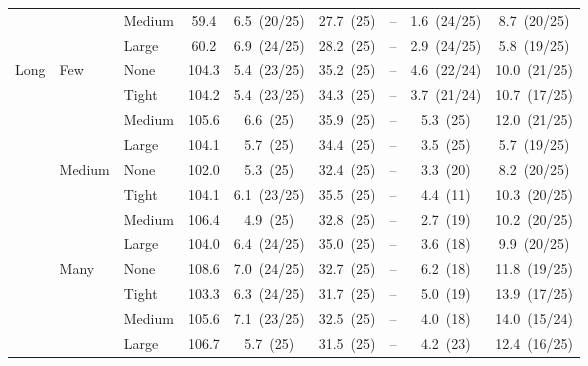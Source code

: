 \begin{table}[htbp]
{\begin{tabular}{lll c ccccc}
 &  & {\small Medium} & 59.4 & 6.5~{\scriptsize(20/25)} & 27.7~{\scriptsize(25)} & -- & 1.6~{\scriptsize(24/25)} & 8.7~{\scriptsize(20/25)} \\
 &  & {\small Large} & 60.2 & 6.9~{\scriptsize(24/25)} & 28.2~{\scriptsize(25)} & -- & 2.9~{\scriptsize(24/25)} & 5.8~{\scriptsize(19/25)} \\
\midrule
\multirow{12}{*}{\small Long} & \multirow{4}{*}{\small Few} & {\small None} & 104.3 & 5.4~{\scriptsize(23/25)} & 35.2~{\scriptsize(25)} & -- & 4.6~{\scriptsize(22/24)} & 10.0~{\scriptsize(21/25)} \\
 &  & {\small Tight} & 104.2 & 5.4~{\scriptsize(23/25)} & 34.3~{\scriptsize(25)} & -- & 3.7~{\scriptsize(21/24)} & 10.7~{\scriptsize(17/25)} \\
 &  & {\small Medium} & 105.6 & 6.6~{\scriptsize(25)} & 35.9~{\scriptsize(25)} & -- & 5.3~{\scriptsize(25)} & 12.0~{\scriptsize(21/25)} \\
 &  & {\small Large} & 104.1 & 5.7~{\scriptsize(25)} & 34.4~{\scriptsize(25)} & -- & 3.5~{\scriptsize(25)} & 5.7~{\scriptsize(19/25)} \\
 & \multirow{4}{*}{\small Medium} & {\small None} & 102.0 & 5.3~{\scriptsize(25)} & 32.4~{\scriptsize(25)} & -- & 3.3~{\scriptsize(20)} & 8.2~{\scriptsize(20/25)} \\
 &  & {\small Tight} & 104.1 & 6.1~{\scriptsize(23/25)} & 35.5~{\scriptsize(25)} & -- & 4.4~{\scriptsize(11)} & 10.3~{\scriptsize(20/25)} \\
 &  & {\small Medium} & 106.4 & 4.9~{\scriptsize(25)} & 32.8~{\scriptsize(25)} & -- & 2.7~{\scriptsize(19)} & 10.2~{\scriptsize(20/25)} \\
 &  & {\small Large} & 104.0 & 6.4~{\scriptsize(24/25)} & 35.0~{\scriptsize(25)} & -- & 3.6~{\scriptsize(18)} & 9.9~{\scriptsize(20/25)} \\
 & \multirow{4}{*}{\small Many} & {\small None} & 108.6 & 7.0~{\scriptsize(24/25)} & 32.7~{\scriptsize(25)} & -- & 6.2~{\scriptsize(18)} & 11.8~{\scriptsize(19/25)} \\
 &  & {\small Tight} & 103.3 & 6.3~{\scriptsize(24/25)} & 31.7~{\scriptsize(25)} & -- & 5.0~{\scriptsize(19)} & 13.9~{\scriptsize(17/25)} \\
 &  & {\small Medium} & 105.6 & 7.1~{\scriptsize(23/25)} & 32.5~{\scriptsize(25)} & -- & 4.0~{\scriptsize(18)} & 14.0~{\scriptsize(15/24)} \\
 &  & {\small Large} & 106.7 & 5.7~{\scriptsize(25)} & 31.5~{\scriptsize(25)} & -- & 4.2~{\scriptsize(23)} & 12.4~{\scriptsize(16/25)} \\
\bottomrule
\end{tabular}%
}
\end{table}
